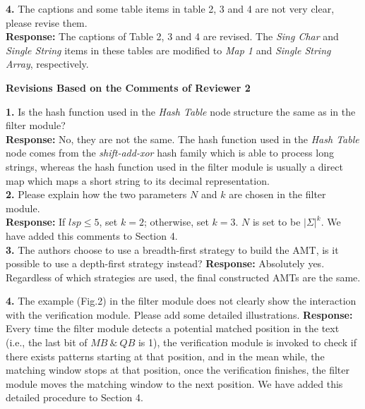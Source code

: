 \documentclass{paper}
\begin{document}
\textbf{4.} The captions and some table items in table 2, 3 and 4 are
not very clear, please revise them.\\[7pt]
\noindent \textbf{Response:} The captions of Table 2, 3 and 4 are
revised. The \emph{Sing Char} and \emph{Single String} items in these
tables are modified to \emph{Map 1} and \emph{Single String Array}, respectively.\\

\begin{center}
\textbf{Revisions Based on the Comments of Reviewer 2}\\
\end{center}

\textbf{1.} Is the hash function used in the \emph{Hash Table} node structure
the same as in the filter module?\\[7pt]
\noindent \textbf{Response:} No, they are not the same. The hash
function used in the \emph{Hash Table} node comes from the
\emph{shift-add-xor} hash family which is able to process long
strings, whereas the hash function used in the filter module is
usually a direct map which maps a short string to its decimal
representation.\\

\textbf{2.} Please explain how the two parameters $N$ and $k$ are chosen in the
filter module.\\[7pt]
\noindent \textbf{Response:} If $lsp \leq 5$, set $k = 2$; otherwise,
set $k=3$. $N$ is set to be $|\Sigma|^k$. We have added this comments
to Section 4.\\

\textbf{3.} The authors choose to use a breadth-first strategy to
build the AMT, is it possible to use a depth-first strategy instead?
\noindent \textbf{Response:} Absolutely yes. Regardless of which
strategies are used, the final constructed AMTs are the same.

\textbf{4.} The example (Fig.2) in the filter module does not clearly
show the interaction with the verification module. Please add some
detailed illustrations.
\noindent \textbf{Response:} Every time the filter module detects a
potential matched position in the text (i.e., the last bit of
$MB~\&~QB$ is 1), the verification module is invoked to check if there
exists patterns starting at that position, and in the mean while, the
matching window stops at that position, once the verification
finishes, the filter module moves the matching window to the next
position. We have added this detailed procedure to Section 4.\\
\end{document}
